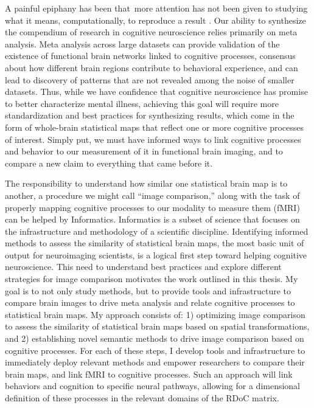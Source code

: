 \documentclass{report}
\begin{document}
A painful epiphany has been that~more attention has not been given to studying what it means, computationally, to reproduce a
result \cite{Open_Science_Collaboration2015-hb}. Our ability to synthesize the compendium of research in cognitive neuroscience relies primarily on meta analysis. Meta analysis across large datasets can provide validation of the existence of functional brain networks linked to cognitive processes, consensus about how different brain regions contribute to behavioral experience, and can lead to discovery of patterns that are not revealed among the noise of smaller datasets. Thus, while we have confidence that cognitive neuroscience has promise to better characterize mental illness, achieving this goal will require more standardization and best practices for synthesizing results, which come in the form of whole-brain statistical maps that reflect one or more cognitive processes of interest. Simply put, we must have informed ways to link cognitive processes and behavior to our measurement of it in functional brain imaging, and to compare a new claim to everything that came before it. 

The responsibility to understand how similar one statistical brain map is to another, a procedure we might call ``image comparison,'' along with the task of properly mapping cognitive processes to our modality to measure them (fMRI) can be helped by Informatics.  Informatics is a subset of science that focuses on the infrastructure and methodology of a scientific discipline. Identifying informed methods to assess the similarity of statistical brain maps, the most basic unit of output for neuroimaging scientists, is a logical first step toward helping cognitive neuroscience. This need to understand best practices and explore different strategies for image comparison motivates the work outlined in this thesis. My goal is to not only study methods, but to provide tools and infrastructure to compare brain images to drive meta analysis and relate cognitive processes to statistical brain maps. My approach consists of: 1) optimizing image comparison to assess the similarity of statistical brain maps based on spatial transformations, and 2) establishing novel semantic methods to drive image comparison based on cognitive processes. For each of these steps, I develop tools and infrastructure to immediately deploy relevant methods and empower researchers to compare their brain maps, and link fMRI to cognitive processes. Such an approach will link behaviors and cognition to specific neural pathways, allowing for a dimensional definition of these processes in the relevant domains of the RDoC matrix.
\end{document}
